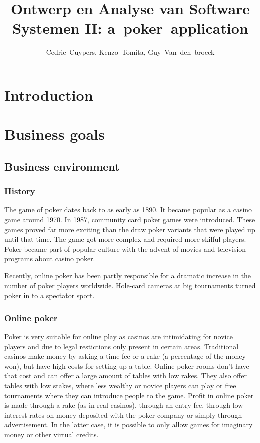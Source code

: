 \documentclass[a4paper,11pt]{report}
\author{Cedric~Cuypers, Kenzo~Tomita, Guy~Van~den~broeck}
\title{Ontwerp en Analyse van Software Systemen II: a~poker~application}
\begin{document}
 
\maketitle 
\tableofcontents 
\chapter{Introduction}
\chapter{Business goals}

\section{Business environment}
\subsection{History}
The game of poker dates back to as early as 1890. It became popular as a casino game around 1970. In 1987, community card poker games were introduced. These games proved far more exciting than the draw poker variants that were played up until that time. The game got more complex and required more skilful players. Poker became part of popular culture with the advent of movies and television programs about casino poker.

Recently, online poker has been partly responsible for a dramatic increase in the number of poker players worldwide. Hole-card cameras at big tournaments turned poker in to a spectator sport.

\subsection{Online poker}
Poker is very suitable for online play as casinos are intimidating for novice players and due to legal restictions only present in certain areas. Traditional casinos make money by asking a time fee or a rake (a percentage of the money won), but have high costs for setting up a table. Online poker rooms don't have that cost and can offer a large amount of tables with low rakes. They also offer tables with low stakes, where less wealthy or novice players can play or free tournaments where they can introduce people to the game.
Profit in online poker is made through a rake (as in real casinos), through an entry fee, through low interest rates on money deposited with the poker company or simply through advertisement. In the latter case, it is possible to only allow games for imaginary money or other virtual credits. 
\end{document}
